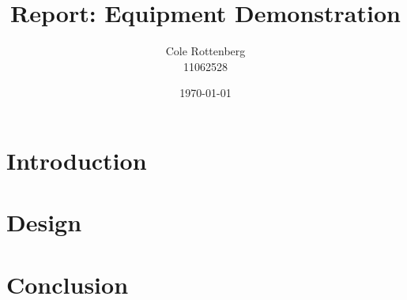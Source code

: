 \documentclass{article}
\title{Report: Equipment Demonstration}
\author{Cole Rottenberg \\ 11062528}
\date{\today}
\begin{document}
\maketitle

\section*{Introduction}

\section*{Design}


\section*{Conclusion}
\end{document}
